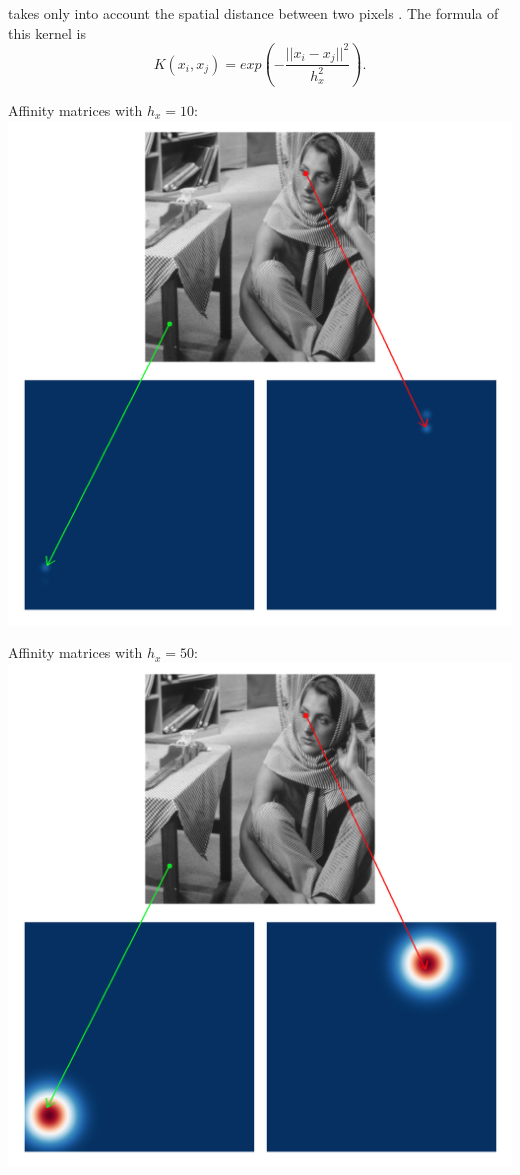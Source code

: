\begin{description}[align=left]
 \item [Spatial Gaussian Kernel] takes only into account the spatial distance between two pixels \cite{siam_slides_2016}.
  The formula of this kernel is
  \[K(x_i, x_j) = exp(-\frac{||x_i - x_j||^2}{h_x^2}).\]

  Affinity matrices with \(h_x = 10\): \\
  \includegraphics[width=\textwidth]{img/spatialAffinitySigma10.png}

  Affinity matrices with \(h_x = 50\): \\
  \includegraphics[width=\textwidth]{img/spatialAffinitySigma50.png}


\end{description}
